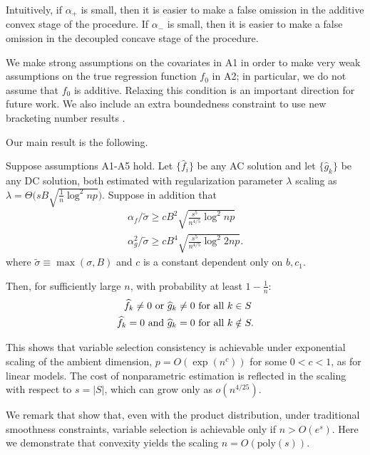 Intuitively, if $\alpha_+$ is small, then it is easier to make a
false omission in the additive convex stage of the procedure. If
$\alpha_-$ is small, then it is easier to make a false omission in
the decoupled concave stage of the procedure.

We make strong assumptions on the covariates in A1 in order to make
very weak assumptions on the true regression function $f_0$ in
A2; in particular, we do not assume that $f_0$ is additive. 
Relaxing this condition is an important direction for future work.
We also include an extra
boundedness constraint to use new bracketing number
results \citep{kim2014global}.

Our main result is the following.
\begin{stheorem}
Suppose assumptions A1-A5 hold. Let $\{\hat{f}_i\}$ be any AC solution and
let $\{\hat{g}_k\}$ be any DC solution, both estimated with 
regularization parameter $\lambda$ scaling as
$\lambda = \Theta \Big( sB \sqrt{\frac{1}{n} \log^2 np} \Big)$. 
Suppose in addition that
\begin{gather}
\alpha_f/\tilde{\sigma} \geq c B^2 \sqrt{\frac{s^5}{n^{4/5}} \log^2
  np}\\
\alpha_g^2/\tilde{\sigma} \geq c B^4 \sqrt{\frac{s^5}{n^{4/5}}
  \log^2 2np}.
\end{gather} 
where $\tilde{\sigma} \equiv \max(\sigma, B)$ and $c$ is a constant dependent only on $b, c_1$.

Then, for sufficiently large $n$, with probability at least $1-\frac{1}{n}$:
\begin{align*}
\widehat{f}_k \neq 0 \textrm{ or } \widehat{g}_k \neq 0 &\textrm{ for all } k \in S\\
\widehat{f}_k = 0 \textrm{ and } \widehat{g}_k = 0 & \textrm{ for all } k \notin S.
\end{align*}


\end{stheorem}

This shows that variable selection consistency is achievable under
exponential scaling of the ambient dimension, $p = O(\exp(n^c))$
for some $0<c<1$, as for linear models. The cost of nonparametric estimation is
reflected in the scaling with respect to $s=|S|$, which can grow only
as $o(n^{4/25})$.

We remark that \citet{dalalyan:12} show that, even with the product distribution,
 under traditional smoothness
constraints, variable selection is achievable only if $n > O(e^s)$. 
Here we demonstrate that convexity yields the scaling $n =
O(\textrm{poly}(s))$.


